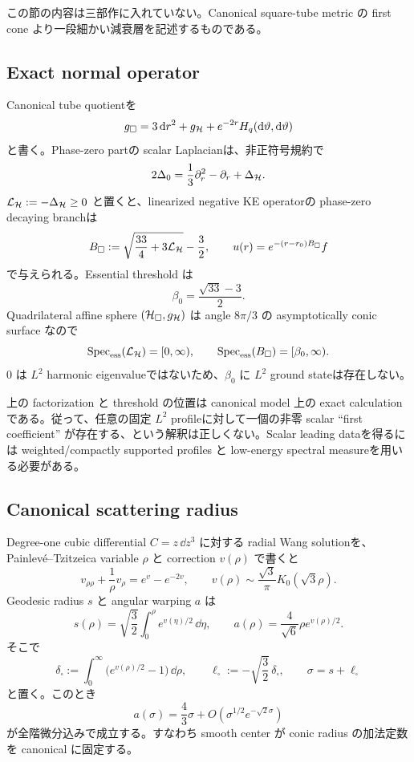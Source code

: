 \documentclass[11pt,a4paper]{ltjsarticle}
\theoremstyle{plain}
\theoremstyle{definition}
\theoremstyle{remark}
\begin{document}
この節の内容は三部作に入れていない。Canonical square-tube metric の first cone より一段細かい減衰層を記述するものである。

\subsection{Exact normal operator}

Canonical tube quotientを
\[
 g_\square
 =3\,\mathrm d r^2+g_{\mathcal H}
 +e^{-2r}H_q(\mathrm d\vartheta,\mathrm d\vartheta)
\]
と書く。Phase-zero partの scalar Laplacianは、非正符号規約で
\[
 2\Delta_0
 =\frac13\partial_r^2-\partial_r+\Delta_{\mathcal H}.
\]
$\mathcal L_{\mathcal H}:=-\Delta_{\mathcal H}\ge0$ と置くと、linearized negative KE operatorの phase-zero decaying branchは
\[
 B_\square
 :=\sqrt{\frac{33}{4}+3\mathcal L_{\mathcal H}}-\frac32,
 \qquad
 u(r)=e^{-(r-r_0)B_\square}f
\]
で与えられる。Essential threshold は
\[
 \beta_0=\frac{\sqrt{33}-3}{2}.
\]
Quadrilateral affine sphere $(\mathcal H_\square,g_{\mathcal H})$ は angle $8\pi/3$ の asymptotically conic surface なので
\[
 \operatorname{Spec}_{\mathrm{ess}}(\mathcal L_{\mathcal H})=[0,\infty),
 \qquad
 \operatorname{Spec}_{\mathrm{ess}}(B_\square)=[\beta_0,\infty).
\]
$0$ は $L^2$ harmonic eigenvalueではないため、$\beta_0$ に $L^2$ ground stateは存在しない。

\begin{resultbox}
上の factorization と threshold の位置は canonical model 上の exact calculation である。従って、任意の固定 $L^2$ profileに対して一個の非零 scalar ``first coefficient'' が存在する、という解釈は正しくない。Scalar leading dataを得るには weighted/compactly supported profiles と low-energy spectral measureを用いる必要がある。
\end{resultbox}

\subsection{Canonical scattering radius}

Degree-one cubic differential $C=z\,\dd z^3$ に対する radial Wang solutionを、Painlev\'e--Tzitzeica variable $\rho$ と correction $v(\rho)$ で書くと
\[
 v_{\rho\rho}+\frac1\rho v_\rho=e^v-e^{-2v},
 \qquad
 v(\rho)\sim\frac{\sqrt3}{\pi}K_0(\sqrt3\rho).
\]
Geodesic radius $s$ と angular warping $a$ は
\[
 s(\rho)=\sqrt{\frac32}\int_0^\rho e^{v(\eta)/2}\,\dd\eta,
 \qquad
 a(\rho)=\frac4{\sqrt6}\rho e^{v(\rho)/2}.
\]
そこで
\[
 \delta_\square
 :=\int_0^\infty\bigl(e^{v(\rho)/2}-1\bigr)\,\dd\rho,
 \qquad
 \ell_\square:=-\sqrt{\frac32}\,\delta_\square,
 \qquad
 \sigma=s+\ell_\square
\]
と置く。このとき
\[
 a(\sigma)=\frac43\sigma
 +O\!\left(\sigma^{1/2}e^{-\sqrt2\sigma}\right)
\]
が全階微分込みで成立する。すなわち smooth center が conic radius の加法定数を canonical に固定する。
\end{document}
